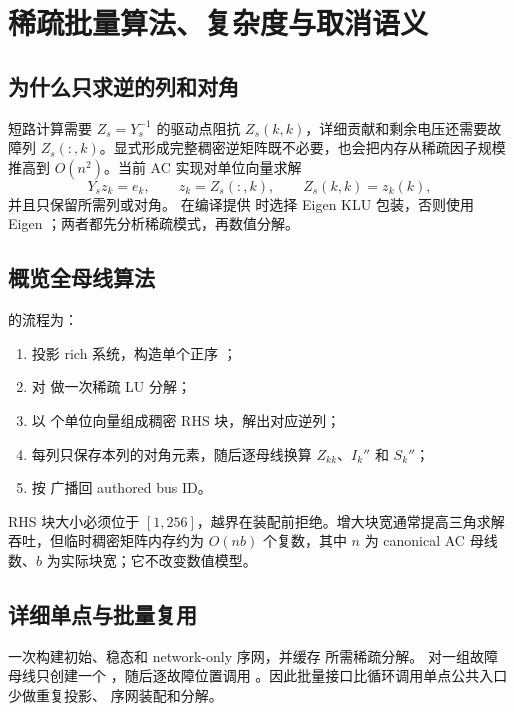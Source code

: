 \section{稀疏批量算法、复杂度与取消语义}\label{sec:sc-sparse}

\subsection{为什么只求逆的列和对角}

短路计算需要 $Z_s=Y_s^{-1}$ 的驱动点阻抗 $Z_s(k,k)$，详细贡献和剩余电压还需要故障列
$Z_s(:,k)$。显式形成完整稠密逆矩阵既不必要，也会把内存从稀疏因子规模推高到
$O(n^2)$。当前 AC 实现对单位向量求解
\begin{equation}
  Y_s z_k=e_k,\qquad z_k=Z_s(:,k),\qquad Z_s(k,k)=z_k(k),
\end{equation}
并且只保留所需列或对角。 在编译提供
 时选择 Eigen KLU 包装，否则使用 Eigen
；两者都先分析稀疏模式，再数值分解。

\subsection{概览全母线算法}

 的流程为：
\begin{enumerate}
  \item 投影 rich 系统，构造单个正序 ；
  \item 对  做一次稀疏 LU 分解；
  \item 以  个单位向量组成稠密 RHS 块，解出对应逆列；
  \item 每列只保存本列的对角元素，随后逐母线换算 $Z_{kk}$、$I_k''$ 和 $S_k''$；
  \item 按  广播回 authored bus ID。
\end{enumerate}
RHS 块大小必须位于 $[1,256]$，越界在装配前拒绝。增大块宽通常提高三角求解吞吐，但临时稠密矩阵内存约为
$O(nb)$ 个复数，其中 $n$ 为 canonical AC 母线数、$b$ 为实际块宽；它不改变数值模型。

\subsection{详细单点与批量复用}

 一次构建初始、稳态和 network-only 序网，并缓存
所需稀疏分解。 对一组故障母线只创建一个
，随后逐故障位置调用
。因此批量接口比循环调用单点公共入口少做重复投影、
序网装配和分解。

